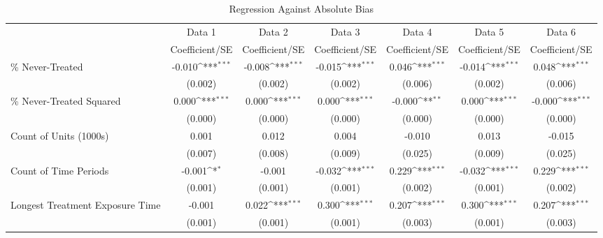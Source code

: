 \begin{table}[htbp]\centering
\def\sym#1{\ifmmode^{#1}\else\(^{#1}\)\fi}
\caption{Regression Against Absolute Bias}
\begin{tabular}{l*{6}{c}}
\hline\hline
                    &\multicolumn{1}{c}{Data 1}&\multicolumn{1}{c}{Data 2}&\multicolumn{1}{c}{Data 3}&\multicolumn{1}{c}{Data 4}&\multicolumn{1}{c}{Data 5}&\multicolumn{1}{c}{Data 6}\\
                    &Coefficient/SE         &Coefficient/SE         &Coefficient/SE         &Coefficient/SE         &Coefficient/SE         &Coefficient/SE         \\
\hline
\% Never-Treated    &      -0.010\sym{***}&      -0.008\sym{***}&      -0.015\sym{***}&       0.046\sym{***}&      -0.014\sym{***}&       0.048\sym{***}\\
                    &     (0.002)         &     (0.002)         &     (0.002)         &     (0.006)         &     (0.002)         &     (0.006)         \\
\% Never-Treated Squared&       0.000\sym{***}&       0.000\sym{***}&       0.000\sym{***}&      -0.000\sym{**} &       0.000\sym{***}&      -0.000\sym{***}\\
                    &     (0.000)         &     (0.000)         &     (0.000)         &     (0.000)         &     (0.000)         &     (0.000)         \\
Count of Units (1000s)&       0.001         &       0.012         &       0.004         &      -0.010         &       0.013         &      -0.015         \\
                    &     (0.007)         &     (0.008)         &     (0.009)         &     (0.025)         &     (0.009)         &     (0.025)         \\
Count of Time Periods&      -0.001\sym{*}  &      -0.001         &      -0.032\sym{***}&       0.229\sym{***}&      -0.032\sym{***}&       0.229\sym{***}\\
                    &     (0.001)         &     (0.001)         &     (0.001)         &     (0.002)         &     (0.001)         &     (0.002)         \\
Longest Treatment Exposure Time&      -0.001         &       0.022\sym{***}&       0.300\sym{***}&       0.207\sym{***}&       0.300\sym{***}&       0.207\sym{***}\\
                    &     (0.001)         &     (0.001)         &     (0.001)         &     (0.003)         &     (0.001)         &     (0.003)         \\

\end{tabular}
\end{table}
